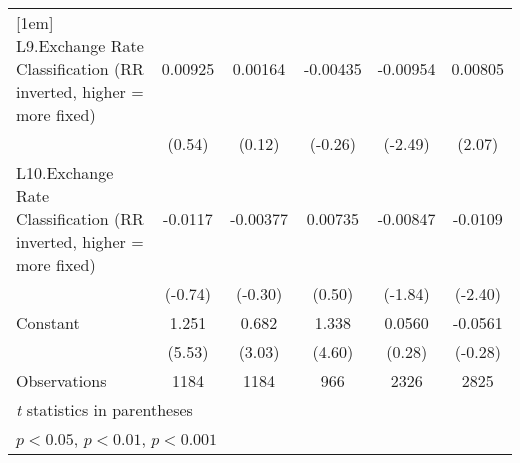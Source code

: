 {\begin{longtable}{l*{5}{c}}
[1em]
L9.Exchange Rate Classification (RR inverted, higher = more fixed)&  0.00925         &  0.00164         & -0.00435         & -0.00954\sym{*}  &  0.00805\sym{*}  \\
                &   (0.54)         &   (0.12)         &  (-0.26)         &  (-2.49)         &   (2.07)         \\
[1em]
L10.Exchange Rate Classification (RR inverted, higher = more fixed)&  -0.0117         & -0.00377         &  0.00735         & -0.00847         &  -0.0109\sym{*}  \\
                &  (-0.74)         &  (-0.30)         &   (0.50)         &  (-1.84)         &  (-2.40)         \\
[1em]
Constant        &    1.251\sym{***}&    0.682\sym{**} &    1.338\sym{***}&   0.0560         &  -0.0561         \\
                &   (5.53)         &   (3.03)         &   (4.60)         &   (0.28)         &  (-0.28)         \\
\hline
Observations    &     1184         &     1184         &      966         &     2326         &     2825         \\
\hline\hline
\multicolumn{6}{l}{\footnotesize \textit{t} statistics in parentheses}\\
\multicolumn{6}{l}{\footnotesize \sym{*} \(p<0.05\), \sym{**} \(p<0.01\), \sym{***} \(p<0.001\)}\\
\end{longtable}
}
